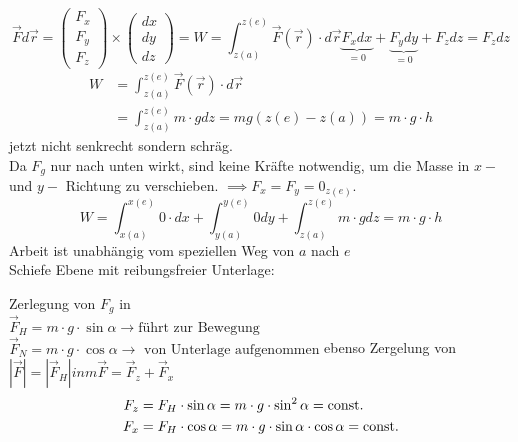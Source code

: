\documentclass[a4paper,10pt]{scrartcl}
\begin{document}
\[
 \vec F d\vec{r} = \begin{pmatrix} F_x\\ F_y\\ F_z \end{pmatrix} \times \begin{pmatrix} dx\\ dy \\ dz \end{pmatrix}=
 W=\int_{z(a)}^{z(e)} \vec F(\vec r)\cdot d\vec{r}
\underbrace{F_x dx}_{=0}+\underbrace{F_ydy}_{=0}+F_z dz=F_z dz
\]
\begin{align*}
 W&=\int_{z(a)}^{z(e)} \vec F(\vec r)\cdot d\vec{r}\\
&= \int_{z(a)}^{z(e)} m\cdot g dz=mg (z(e)-z(a))=m\cdot g \cdot h
\end{align*}
jetzt nicht senkrecht sondern schräg.\\
Da $F_g$ nur nach unten wirkt, sind keine Kräfte notwendig, um die Masse in $x-$ und $y-$ Richtung zu verschieben. $\implies F_x=F_y=0_{z(e)}$.
\[
 W=\int_{x(a)}^{x(e)}0\cdot dx+\int_{y(a)}^{y(e)} 0 dy+\int_{z(a)}^{z(e)} m\cdot g dz=m\cdot g\cdot h
\]
Arbeit ist unabhängig vom speziellen Weg von $a$ nach $e$\\
Schiefe Ebene mit reibungsfreier Unterlage:\\

Zerlegung von $F_g$ in\\
$\vec F_H=m\cdot g\cdot \sin \alpha \to \text{führt zur Bewegung}$
$\vec F_N=m\cdot g\cdot \cos \alpha \to \text{ von Unterlage aufgenommen}$
ebenso Zergelung von $|\vec F|=|\vec F_H| in m\vec F=\vec F_z+\vec F_x$
\begin{align*}
 F_z&=F_H\cdot \sin \alpha =m\cdot g \cdot \sin^2 \alpha=\text{const}.\\
 F_x&= F_H\cdot \cos \alpha =m\cdot g\cdot \sin \alpha \cdot \cos \alpha=\text{const}.
\end{align*}
\end{document}
